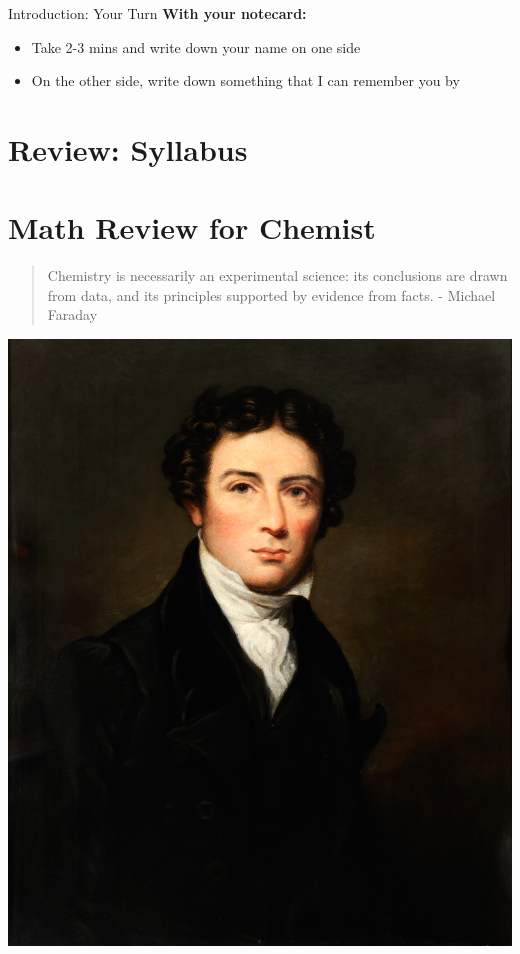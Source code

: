 \documentclass[11pt]{beamer}
\begin{document}
\begin{frame}{Introduction: Your Turn}
  \textbf{With your notecard:}
  \begin{itemize}
  \item Take 2-3 mins and write down your name on one side
  \item On the other side, write down something that I can
    remember you by
  \end{itemize}
\end{frame}

\section{Review: Syllabus}

\section{Math Review for Chemist}

\begin{frame}
  \vspace{1in}
  \begin{quote}
    Chemistry is necessarily an experimental science: its
    conclusions are drawn from data, and its principles
    supported by evidence from facts. - Michael Faraday
  \end{quote}
  
  \begin{center}
    \includegraphics[scale=0.08]{micahel_fara}
  \end{center}
\end{frame}
\end{document}
